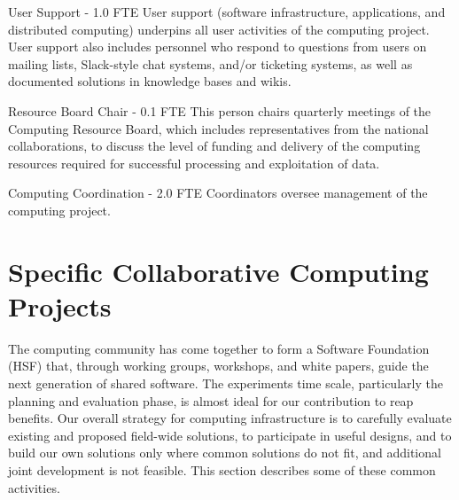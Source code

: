 \begin{description}
\item {User Support - 1.0 FTE}
User support (software infrastructure, applications, and distributed computing) underpins all user activities of the computing project. User support also includes personnel who respond to questions from users on mailing lists, Slack-style chat systems, and/or ticketing systems, as well as documented solutions in knowledge bases and wikis.%

\item {Resource Board Chair - 0.1 FTE}
This person chairs quarterly meetings of the Computing Resource Board, which includes representatives from the national  collaborations, to discuss the level of funding and delivery of the computing resources required for successful processing and exploitation of  data. %

\item {Computing Coordination - 2.0 FTE}
Coordinators oversee management of the computing project. %

\end{description}



\section{Specific Collaborative Computing Projects}
\label{ch:exec-comp-gov-coop}

The  computing community has come together to form a  Software Foundation (HSF)\cite{Alves:2017she} that, through working groups, workshops, and white papers, guide the next generation of shared  software.  The  experiments time scale, particularly the planning and evaluation phase, is almost ideal for our contribution to reap benefits.  Our overall strategy for computing infrastructure is to carefully evaluate existing and proposed field-wide solutions, to participate in useful designs, and to build our own solutions only where common solutions do not fit, and additional joint development is not feasible.   This section describes some of these common activities. 



